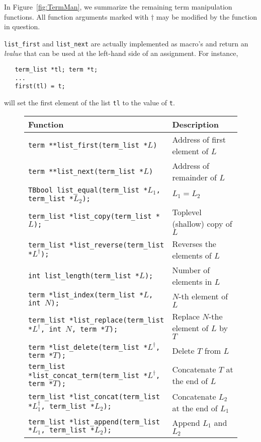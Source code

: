 In Figure~\ref{fig:TermMan}, we summarize the remaining term manipulation functions.
All function arguments marked with $\dag$ may be modified by the function in question.

{\tt list\_first} and {\tt list\_next} are actually implemented as macro's and 
return an {\em lvalue} that can be used
at the left-hand side of an assignment.
For instance,
\begin{verbatim}
   term_list *tl; term *t;
   ...
   first(tl) = t;
\end{verbatim}
will set the first element of the list {\tt tl} to the value of {\tt t}.

\begin{figure}[tb]
\begin{center}
\begin{tabular}{|l|p{5cm}|}
\hline Function		& Description				\\ \hline \hline
{\tt term **list\_first(term\_list *$L$)}					& Address of first element of $L$\\
{\tt term **list\_next(term\_list *$L$)}					& Address of remainder of $L$\\ \hline
{\tt TBbool     list\_equal(term\_list *$L_1$, term\_list *$L_2$);}	& $L_1 = L_2$\\
{\tt term\_list *list\_copy(term\_list *$L$);}					& Toplevel (shallow) copy of $L$\\
{\tt term\_list *list\_reverse(term\_list *$L^{\dag}$);}			& Reverses the elements of $L$\\
{\tt int        list\_length(term\_list *$L$);}					& Number of elements in $L$\\ \hline
{\tt term      *list\_index(term\_list *$L$, int $N$);}				& $N$-th element of $L$\\
{\tt term\_list *list\_replace(term\_list *$L^{\dag}$, int $N$, term *$T$);}	&  Replace $N$-the element of $L$ by $T$\\
{\tt term      *list\_delete(term\_list *$L^{\dag}$, term *$T$);}		& Delete $T$ from $L$\\ \hline

{\tt term\_list *list\_concat\_term(term\_list *$L^{\dag}$, term *$T$);}	& Concatenate $T$ at the end of $L$ \\
{\tt term\_list *list\_concat(term\_list *$L_1^{\dag}$, term\_list *$L_2$);}	& Concatenate $L_2$ at the end of $L_1$\\
{\tt term\_list *list\_append(term\_list *$L_1$, term\_list *$L_2$);}		& Append $L_1$ and $L_2$\\


\end{tabular}
\end{center}
\end{figure}
